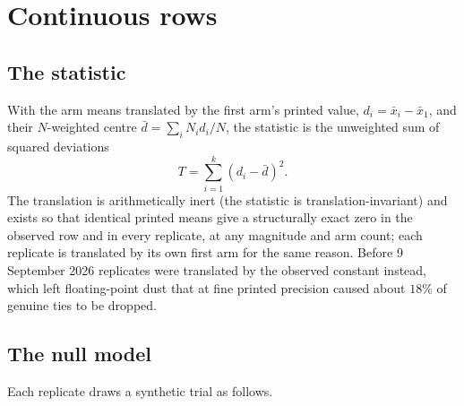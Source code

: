 \documentclass[11pt,a4paper]{article}
\begin{document}
\section{Continuous rows}
\label{sec:continuous}

\subsection{The statistic}

With the arm means translated by the first arm's printed value, $d_i = \bar{x}_i - \bar{x}_1$, and their $N$-weighted centre $\bar{d} = \sum_i N_i d_i / N$, the statistic is the unweighted sum of squared deviations
\begin{equation}
T = \sum_{i=1}^{k} (d_i - \bar{d})^2 .
\label{eq:Tcont}
\end{equation}
The translation is arithmetically inert (the statistic is translation-invariant) and exists so that identical printed means give a structurally exact zero in the observed row and in every replicate, at any magnitude and arm count; each replicate is translated by its own first arm for the same reason. Before 9 September 2026 replicates were translated by the observed constant instead, which left floating-point dust that at fine printed precision caused about $18\%$ of genuine ties to be dropped.

\subsection{The null model}

Each replicate draws a synthetic trial as follows.
\end{document}
